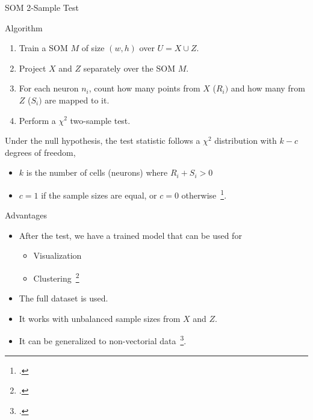\documentclass[10pt]{beamer}
\begin{document}

\begin{frame}{SOM 2-Sample Test}
    \begin{block}{Algorithm}
        \begin{enumerate}
        \item Train a SOM $M$ of size $(w, h)$ over $U = X \cup Z$.
        \item Project $X$ and $Z$ separately over the SOM  $M$.
        \item For each neuron $n_i$, count how many points from $X$ ($R_i)$ and how many from $Z$ ($S_i)$ are mapped to it.
        \item Perform a $\chi^2$ two-sample test.
        \end{enumerate}

        Under the null hypothesis, the test statistic follows a $\chi^2$ distribution with $k - c$ degrees of freedom,
        \begin{itemize}
            \item $k$ is the number of cells (neurons) where ${R_i + S_i > 0}$
            \item $c = 1$ if the sample sizes are equal, or $c = 0$ otherwise~\footcite{press1993numerical}.
        \end{itemize}        
    \end{block}
\end{frame}

\begin{frame}{Advantages}
    \begin{itemize}
        \item After the test, we have a trained model that can be used for
            
            \begin{itemize}
                \item Visualization
                \item Clustering~\footcite{ultsch2005esom}
            \end{itemize}

        \item The full dataset is used.
        \item It works with unbalanced sample sizes from $X$ and $Z$.
        \item It can be generalized to non-vectorial data~\footcite{kohonen1982self}.
    \end{itemize}

\end{frame}
\end{document}

